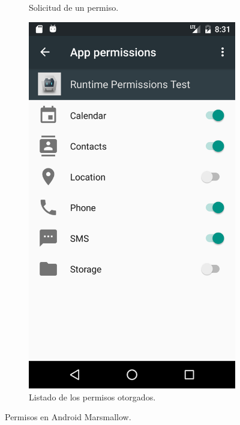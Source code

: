 \begin{figure}[btp]
\begin{subfigure}{0.28\linewidth}
        \caption{Solicitud de un permiso.}
        \label{fig:ch01:permission-request}
    \end{subfigure}
    \begin{subfigure}{0.28\linewidth}
        \includegraphics[width=\linewidth]{imgs/chapter1/app-permissions}
        \caption{Listado de los permisos otorgados.}
	    \label{fig:ch03:app-permissions-overview}
	\end{subfigure}
	\caption{Permisos en Android Marsmallow.}
	\label{fig:ch03:app-permissions-android}
\end{figure}
